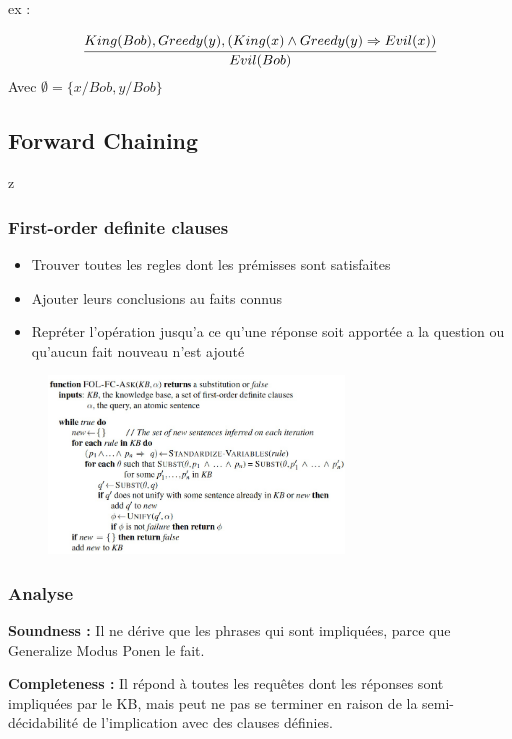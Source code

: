 			ex :
			
			\begin{equation}
			\cfrac{King(Bob), Greedy(y), (King(x) \land Greedy(y) \Rightarrow Evil(x))}{Evil(Bob)}
			\end{equation}
			Avec $\emptyset = \{x/Bob, y/Bob\}$	
			
	\subsection{Forward Chaining}z
		\subsubsection{First-order definite clauses}

		\begin{itemize}
			\item Trouver toutes les regles dont les prémisses sont satisfaites
			\item Ajouter leurs conclusions au faits connus
			\item Repréter l'opération jusqu'a ce qu'une réponse soit apportée a la question  ou qu'aucun fait nouveau n'est ajouté
			
		\end{itemize}	
		
		\begin{figure}[htp]	
			\centering
			\includegraphics[width=0.7\textwidth]{img/ForwardChaining.png}
		\end{figure}		
		
		\subsubsection{Analyse}
			\textbf{Soundness :} Il ne dérive que les phrases qui sont impliquées, parce que Generalize Modus Ponen le fait.
			
			\textbf{Completeness :} Il répond à toutes les requêtes dont les réponses sont impliquées par le KB, mais peut ne pas se terminer en raison de la semi-décidabilité de l'implication avec des clauses définies.
			
